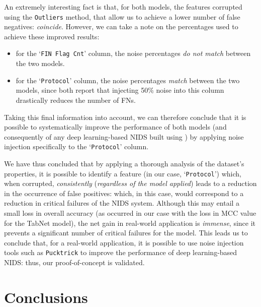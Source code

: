 \documentclass[../main.tex]{subfiles}
\begin{document}
An extremely interesting fact is that, for both models, the features corrupted using the \texttt{Outliers} method, that allow us to achieve a lower number of false negatives: \emph{coincide}.  However, we can take a note on the percentages used to achieve these improved results:
\begin{itemize}
    \item for the ‘\texttt{FIN Flag Cnt}’ column, the noise percentages \emph{do not match} between the two models.
    \item for the ‘\texttt{Protocol}’ column, the noise percentages \emph{match} between the two models, since both report that injecting 50\% noise into this column drastically reduces the number of FNs.
\end{itemize}
Taking this final information into account, we can therefore conclude that it is possible to systematically improve the performance of both models (and consequently of any deep learning-based NIDS built using ) by applying noise injection specifically to the ‘\texttt{Protocol}’ column.

We have thus concluded that by applying a thorough analysis of the dataset’s properties, it is possible to identify a feature (in our case, ‘\texttt{Protocol}’) which, when corrupted, \emph{consistently} (\emph{regardless of the model applied}) leads to a reduction in the occurrence of false positives: which, in this case, would correspond to a reduction in critical failures of the NIDS system. Although this may entail a small loss in overall accuracy (as occurred in our case with the loss in MCC value for the TabNet model), the net gain in real-world application is \emph{immense}, since it prevents a significant number of critical failures for the model. This leads us to conclude that, for a real-world application, it is possible to use noise injection tools such as \texttt{Pucktrick} to improve the performance of deep learning-based NIDS: thus, our proof-of-concept is validated. 


\newpage
\section{Conclusions}
\label{sec:conclusions}
\end{document}
